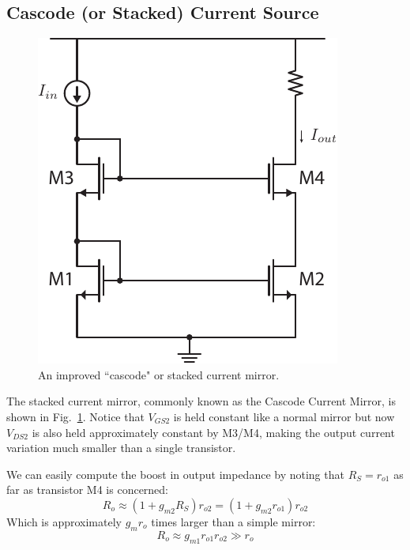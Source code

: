 \subsection{Cascode (or Stacked) Current Source}




\begin{figure}[tb]
\begin{center}
\includegraphics[scale=1]{12mirror_cascode.pdf}
\end{center}
\caption{An improved ``cascode" or stacked current mirror.} \label{fig:12mirror_cascode.pdf}
\end{figure}

The stacked current mirror, commonly known as the Cascode Current Mirror, is shown in Fig.~\ref{fig:12mirror_cascode.pdf}.  Notice that $V_{GS2}$ is held constant like a normal mirror but now $V_{DS2}$ is also held  approximately constant by M3/M4, making the output current variation much smaller than a single transistor. 

We can easily compute the boost in output impedance by noting that $R_S = r_{o1}$ as far as transistor M4 is concerned: 
%
\begin{equation}
	{R_o} \approx \left( {1 + {g_{m2}}{R_S}} \right){r_{o2}} = \left( {1 + {g_{m2}}{r_{o1}}} \right){r_{o2}}
\end{equation}
%
Which is approximately $g_m r_o$ times larger than a simple mirror:
%
\begin{equation}
	{R_o} \approx {g_{m1}}r_{o1} r_{o2} \gg {r_o}
\end{equation}

